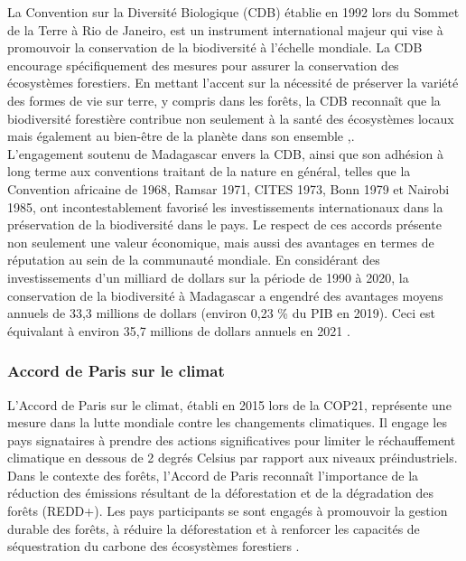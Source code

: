 La Convention sur la Diversité Biologique (CDB) établie en 1992 lors du Sommet de la Terre à Rio de Janeiro, est un instrument international majeur qui vise à promouvoir la conservation de la biodiversité à l'échelle mondiale. La CDB encourage spécifiquement des mesures pour assurer la conservation des écosystèmes forestiers. En mettant l'accent sur la nécessité de préserver la variété des formes de vie sur terre, y compris dans les forêts, la CDB reconnaît que la biodiversité forestière contribue non seulement à la santé des écosystèmes locaux mais également au bien-être de la planète dans son ensemble \cite{27},\cite{28}.
\\

L'engagement soutenu de Madagascar envers la CDB, ainsi que son adhésion à long terme aux conventions traitant de la nature en général, telles que la Convention africaine de 1968, Ramsar 1971, CITES 1973, Bonn 1979 et Nairobi 1985, ont incontestablement favorisé les investissements internationaux dans la préservation de la biodiversité dans le pays. Le respect de ces accords présente non seulement une valeur économique, mais aussi des avantages en termes de réputation au sein de la communauté mondiale. En considérant des investissements d'un milliard de dollars sur la période de 1990 à 2020, la conservation de la biodiversité à Madagascar a engendré des avantages moyens annuels de 33,3 millions de dollars (environ 0,23 \% du PIB en 2019). Ceci est équivalant à environ 35,7 millions de dollars annuels en 2021 \cite{24}.
\\

\subsubsection{Accord de Paris sur le climat}
L'Accord de Paris sur le climat, établi en 2015 lors de la COP21, représente une mesure dans la lutte mondiale contre les changements climatiques. Il engage les pays signataires à prendre des actions significatives pour limiter le réchauffement climatique en dessous de 2 degrés Celsius par rapport aux niveaux préindustriels. Dans le contexte des forêts, l'Accord de Paris reconnaît l'importance de la réduction des émissions résultant de la déforestation et de la dégradation des forêts (REDD+). Les pays participants se sont engagés à promouvoir la gestion durable des forêts, à réduire la déforestation et à renforcer les capacités de séquestration du carbone des écosystèmes forestiers \cite{29}. 
\\

